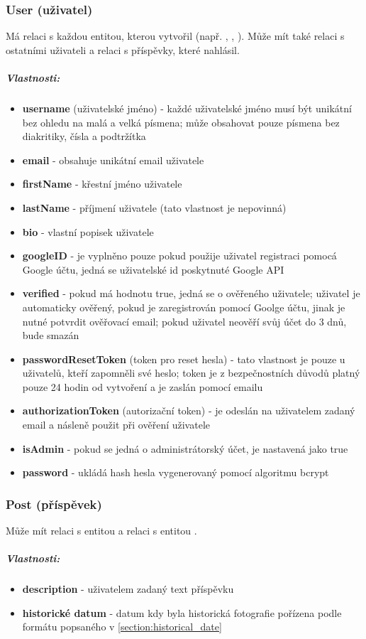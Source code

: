 \documentclass[12pt, a4paper,
 twoside,        %
 openright
]{report}
\newenvironment{propertiesItemize}{
\begin{itemize}{ 
  }}
  {\end{itemize}}
\begin{document}
\subsubsection{User (uživatel)}  Má relaci  s každou entitou, kterou vytvořil (např. , , ). Může mít také relaci  s ostatními uživateli a relaci  s příspěvky, které nahlásil.
\subparagraph{Vlastnosti:}
\begin{propertiesItemize}
	\item \textbf{username} (uživatelské jméno) - každé uživatelské jméno musí být unikátní bez ohledu na malá a velká písmena; může obsahovat pouze písmena bez diakritiky, čísla a podtržítka
	\item \textbf{email} - obsahuje unikátní email uživatele
	\item \textbf{firstName} - křestní jméno uživatele
	\item \textbf{lastName} - příjmení uživatele (tato vlastnost je nepovinná)
	\item \textbf{bio} - vlastní popisek uživatele
	\item \textbf{googleID} - je vyplněno pouze pokud použije uživatel registraci pomocá Google účtu, jedná se uživatelské id poskytnuté Google API
	\item \textbf{verified} - pokud má hodnotu true, jedná se o ověřeného uživatele; uživatel je automaticky ověřený, pokud je zaregistrován pomocí Goolge účtu, jinak je nutné potvrdit ověřovací email; pokud uživatel neověří svůj účet do 3 dnů, bude smazán
	\item \textbf{passwordResetToken} (token pro reset hesla) - tato vlastnost je pouze u uživatelů, kteří zapomněli své heslo; token je z bezpečnostních důvodů platný pouze 24 hodin od vytvoření a je zaslán pomocí emailu
	\item \textbf{authorizationToken} (autorizační token) - je odeslán na uživatelem zadaný email a násleně použit při ověření uživatele
	\item \textbf{isAdmin} - pokud se jedná o administrátorský účet, je nastavená jako true
	\item \textbf{password} - ukládá hash hesla vygenerovaný pomocí algoritmu bcrypt
\end{propertiesItemize}

\subsubsection{Post (příspěvek)}  Může mít relaci  s entitou  a relaci  s entitou .
\subparagraph{Vlastnosti:}
\begin{propertiesItemize}
	\item \textbf{description} - uživatelem zadaný text příspěvku
	\item \textbf{historické datum} - datum kdy byla historická fotografie pořízena podle formátu popsaného v \ref{section:historical_date}
\end{propertiesItemize}
\end{document}
